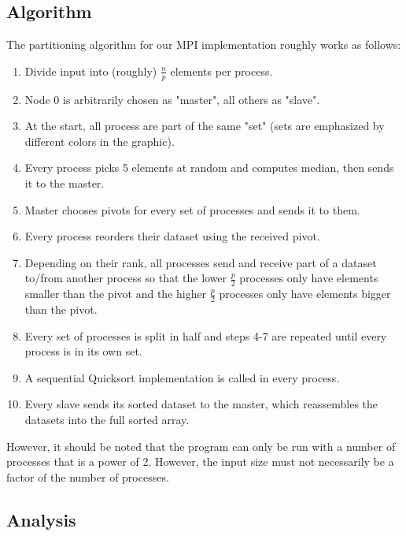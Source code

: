 \documentclass[12pt,a4paper]{article}
\begin{document}
\subsection{Algorithm}
The partitioning algorithm for our MPI implementation roughly works as follows:
\begin{enumerate}
	\item Divide input into (roughly) $\frac{n}{p}$ elements per process.
	\item Node 0 is arbitrarily chosen as "master", all others as "slave".
	\item At the start, all process are part of the same "set" (sets are emphasized by different colors in the graphic).
	\item Every process picks 5 elements at random and computes median, then sends it to the master.
	\item Master chooses pivots for every set of processes and sends it to them.
	\item Every process reorders their dataset using the received pivot.
	\item Depending on their rank, all processes send and receive part of a dataset to/from another process so that the lower $\frac{p}{2}$ processes only have elements smaller than the pivot and the higher $\frac{p}{2}$ processes only have elements bigger than the pivot.
	\item Every set of processes is split in half and steps 4-7 are repeated until every process is in its own set.
	\item A sequential Quicksort implementation is called in every process.
	\item Every slave sends its sorted dataset to the master, which reassembles the datasets into the full sorted array.
\end{enumerate}
However, it should be noted that the program can only be run with a number of processes that is a power of 2. However, the input size must not necessarily be a factor of the number of processes. 
\subsection{Analysis}
\end{document}
